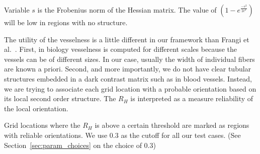 Variable $s$ is the Frobenius norm of the Hessian matrix. The value  of $(1-e^{\frac{-s^2}{2c^2}})$ will be low in regions with no structure.

The utility of the vesselness is a little different in our framework than Frangi et al.~\cite{Frangi1998}.
First, in biology vesselness is computed for different scales because the vessels can be of different sizes. In our case, usually the width of individual fibers are known a priori.
Second, and more importantly, we do not have clear tubular structures embedded in a dark contrast matrix such as in blood vessels.
Instead, we are trying to associate each grid location  with a probable orientation based on its local second order structure. The $R_{H}$ is interpreted as a measure reliability of the local orientation.

Grid locations where the $R_{H}$ is above a certain threshold are marked as regions with reliable orientations.
We use 0.3 as the cutoff for all our test cases. (See Section~\ref{sec:param_choices} on the choice of 0.3)



%

